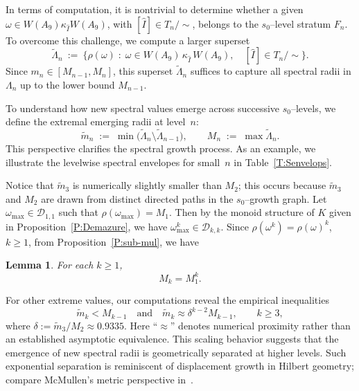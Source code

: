 \documentclass[11pt]{amsart}
\numberwithin{equation}{section}
\newtheorem{lem}[thm]{Lemma}
\begin{document}
\medskip
In terms of computation, it is nontrivial to determine whether a given
\(\omega \in W(A_9)\kappa_{\widehat I}W(A_9)\), with
\([\widehat I] \in T_n/\!\sim\), belongs to the \(s_0\)--level stratum \(F_n\).
To overcome this challenge, we compute a larger superset
\[
\tilde \Lambda_n
\ :=\
\bigl\{
\rho(\omega) \;:\;
\omega \in W(A_9)\,\kappa_{\widehat I}\,W(A_9),
\quad [\widehat I] \in T_n/\!\sim
\bigr\}.
\]
Since \(m_n \in [M_{n-1}, M_n]\), this superset \(\tilde \Lambda_n\) suffices to capture
all spectral radii in \(\Lambda_n\) up to the lower bound \(M_{n-1}\).

\medskip
To understand how new spectral values emerge across successive
\(s_0\)--levels, we define the extremal emerging radii at level~\(n\):
\[
\tilde m_n \;:=\;
\min\bigl( \tilde \Lambda_n \setminus \tilde \Lambda_{n-1} \bigr),
\qquad
M_n \;:=\; \max \tilde \Lambda_n.
\]
This perspective clarifies the spectral growth process.
As an example, we illustrate the levelwise spectral envelopes
for small~\(n\) in Table~\ref{T:Senvelops}.

\medskip
Notice that \(\tilde m_3\) is numerically slightly smaller than \(M_2\);
this occurs because \(\tilde m_3\) and \(M_2\) are drawn from
distinct directed paths in the \(s_0\)--growth graph. 
Let $\omega_\text{max} \in \mathcal{D}_{1,1}$ such that $\rho(\omega_\text{max}) = M_1$. Then by the monoid structure of $K$ given in Proposition~\ref{P:Demazure}, we have $\omega_\text{max}^k \in \mathcal{D}_{k,k}$. Since $\rho(\omega^k) = \rho(\omega)^k$, $k\ge 1$, from Proposition~\ref{P:sub-mul}, we have
\begin{lem} \label{L:maxM}
For each $k\ge 1$,
\[
M_k = M_1^k.
\]
\end{lem}
For other extreme values, our computations reveal the empirical inequalities
\[
\tilde m_k < M_{k-1}
\quad\text{and}\quad
\tilde m_k \approx \delta^{k-2} M_{k-1},
\qquad k \ge 3,
\]
where \(\delta := \tilde m_3/M_2 \approx 0.9335\).
Here ``\(\approx\)'' denotes numerical proximity rather than
an established asymptotic equivalence.
This scaling behavior suggests that the emergence of new spectral radii
is geometrically separated at higher levels.
Such exponential separation is reminiscent of displacement growth in Hilbert geometry; compare McMullen's metric perspective in~\cite{McMullen:2002}.
\end{document}
